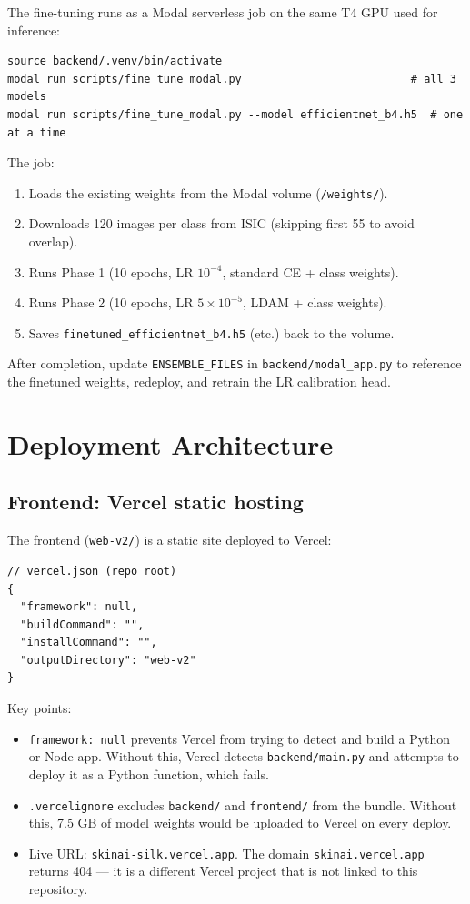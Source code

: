 \documentclass[12pt,a4paper]{article}
\begin{document}
The fine-tuning runs as a Modal serverless job on the same T4 GPU used for inference:

\begin{lstlisting}
source backend/.venv/bin/activate
modal run scripts/fine_tune_modal.py                          # all 3 models
modal run scripts/fine_tune_modal.py --model efficientnet_b4.h5  # one at a time
\end{lstlisting}

The job:
\begin{enumerate}
  \item Loads the existing weights from the Modal volume (\texttt{/weights/}).
  \item Downloads 120 images per class from ISIC (skipping first 55 to avoid overlap).
  \item Runs Phase 1 (10 epochs, LR $10^{-4}$, standard CE + class weights).
  \item Runs Phase 2 (10 epochs, LR $5 \times 10^{-5}$, LDAM + class weights).
  \item Saves \texttt{finetuned\_efficientnet\_b4.h5} (etc.) back to the volume.
\end{enumerate}

After completion, update \texttt{ENSEMBLE\_FILES} in \texttt{backend/modal\_app.py} to
reference the finetuned weights, redeploy, and retrain the LR calibration head.

\section{Deployment Architecture}

\subsection{Frontend: Vercel static hosting}

The frontend (\texttt{web-v2/}) is a static site deployed to Vercel:

\begin{lstlisting}
// vercel.json (repo root)
{
  "framework": null,
  "buildCommand": "",
  "installCommand": "",
  "outputDirectory": "web-v2"
}
\end{lstlisting}

Key points:
\begin{itemize}
  \item \texttt{framework: null} prevents Vercel from trying to detect and build a Python
    or Node app. Without this, Vercel detects \texttt{backend/main.py} and attempts to
    deploy it as a Python function, which fails.
  \item \texttt{.vercelignore} excludes \texttt{backend/} and \texttt{frontend/} from the
    bundle. Without this, 7.5 GB of model weights would be uploaded to Vercel on every deploy.
  \item Live URL: \texttt{skinai-silk.vercel.app}. The domain \texttt{skinai.vercel.app}
    returns 404 --- it is a different Vercel project that is not linked to this repository.
\end{itemize}
\end{document}
